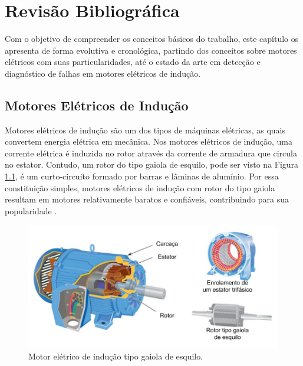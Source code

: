 
\chapter{Revisão Bibliográfica}

Com o objetivo de compreender os conceitos básicos do trabalho, este capítulo os apresenta de forma evolutiva e 
cronológica, partindo dos conceitos sobre motores elétricos com suas particularidades, até o estado da arte em 
detecção e diagnóstico de falhas em motores elétricos de indução. 


% 

\section{Motores Elétricos de Indução}\label{sec:}

Motores elétricos de indução são um dos tipos de máquinas elétricas, as quais convertem energia elétrica em mecânica. 
Nos motores elétricos de indução, uma corrente elétrica é induzida no rotor através da corrente de armadura que circula
no estator. Contudo, um rotor do tipo gaiola de esquilo, pode ser visto na Figura \ref{fig:ind_motor_petruzella_p115}, 
é um curto-circuito formado por barras e lâminas de alumínio. Por essa constituição simples, motores elétricos de indução
com rotor do tipo gaiola resultam em motores relativamente baratos e confiáveis, contribuindo para sua popularidade \cite{Umans2003}.
 
\begin{figure}[H]
    \caption{Motor elétrico de indução tipo gaiola de esquilo.}
    \begin{center}
        \includegraphics[scale=0.8, page=1]{referencial/img/imagens_referencial.pdf}
    \end{center}
    \label{fig:ind_motor_petruzella_p115}
\end{figure}

